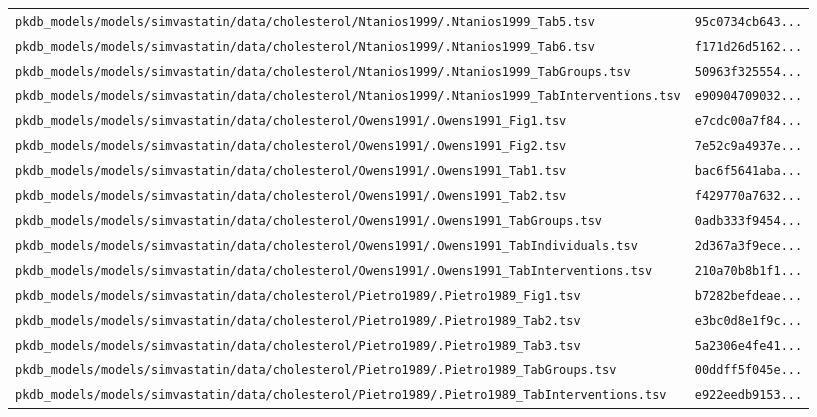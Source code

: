\begin{longtable}{ll}
\texttt{pkdb\_models/models/simvastatin/data/cholesterol/Ntanios1999/.Ntanios1999\_Tab5.tsv} & \texttt{95c0734cb643...} \\
\texttt{pkdb\_models/models/simvastatin/data/cholesterol/Ntanios1999/.Ntanios1999\_Tab6.tsv} & \texttt{f171d26d5162...} \\
\texttt{pkdb\_models/models/simvastatin/data/cholesterol/Ntanios1999/.Ntanios1999\_TabGroups.tsv} & \texttt{50963f325554...} \\
\texttt{pkdb\_models/models/simvastatin/data/cholesterol/Ntanios1999/.Ntanios1999\_TabInterventions.tsv} & \texttt{e90904709032...} \\
\texttt{pkdb\_models/models/simvastatin/data/cholesterol/Owens1991/.Owens1991\_Fig1.tsv} & \texttt{e7cdc00a7f84...} \\
\texttt{pkdb\_models/models/simvastatin/data/cholesterol/Owens1991/.Owens1991\_Fig2.tsv} & \texttt{7e52c9a4937e...} \\
\texttt{pkdb\_models/models/simvastatin/data/cholesterol/Owens1991/.Owens1991\_Tab1.tsv} & \texttt{bac6f5641aba...} \\
\texttt{pkdb\_models/models/simvastatin/data/cholesterol/Owens1991/.Owens1991\_Tab2.tsv} & \texttt{f429770a7632...} \\
\texttt{pkdb\_models/models/simvastatin/data/cholesterol/Owens1991/.Owens1991\_TabGroups.tsv} & \texttt{0adb333f9454...} \\
\texttt{pkdb\_models/models/simvastatin/data/cholesterol/Owens1991/.Owens1991\_TabIndividuals.tsv} & \texttt{2d367a3f9ece...} \\
\texttt{pkdb\_models/models/simvastatin/data/cholesterol/Owens1991/.Owens1991\_TabInterventions.tsv} & \texttt{210a70b8b1f1...} \\
\texttt{pkdb\_models/models/simvastatin/data/cholesterol/Pietro1989/.Pietro1989\_Fig1.tsv} & \texttt{b7282befdeae...} \\
\texttt{pkdb\_models/models/simvastatin/data/cholesterol/Pietro1989/.Pietro1989\_Tab2.tsv} & \texttt{e3bc0d8e1f9c...} \\
\texttt{pkdb\_models/models/simvastatin/data/cholesterol/Pietro1989/.Pietro1989\_Tab3.tsv} & \texttt{5a2306e4fe41...} \\
\texttt{pkdb\_models/models/simvastatin/data/cholesterol/Pietro1989/.Pietro1989\_TabGroups.tsv} & \texttt{00ddff5f045e...} \\
\texttt{pkdb\_models/models/simvastatin/data/cholesterol/Pietro1989/.Pietro1989\_TabInterventions.tsv} & \texttt{e922eedb9153...} \\

\end{longtable}
